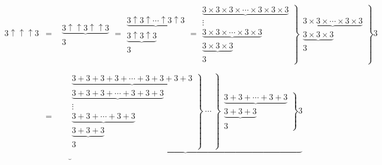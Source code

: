 \documentclass[a4j,fleqn,10pt]{jarticle}
\begin{document}
\scriptsize {
\begin{eqnarray}
3 \uparrow \uparrow \uparrow 3&=&
\left .
\begin{array} {c}
\underbrace {
3 \uparrow \uparrow 3 \uparrow \uparrow 3
}\\
3
\end{array}
\right . 
%
=
\left .
\begin{array} {c}
\underbrace {
3 \uparrow 3 \uparrow \cdots \uparrow 3 \uparrow 3
} \\
\underbrace {
3 \uparrow 3 \uparrow 3
} \\
3
\end{array}
\right .
=
\left . 
\left .
\begin{array} {c}
\underbrace {3 \times 3 \times 3 \times \dotsb \times 3 \times 3 \times 3 } \\
\vdots \\
\underbrace {3 \times 3 \times \dotsb \times 3 \times 3 } \\
\underbrace {3 \times 3 \times 3 } \\
3
\end{array}
\right \}
\begin{array} {c}
\underbrace {3 \times 3 \times \dotsb \times 3 \times 3 } \\
\underbrace {3 \times 3 \times 3 } \\
3
\end{array}
\right \} 3
\\
\nonumber \\
%
&=&
\left .
\begin{array} {rc}
&
\underbrace {
\left .
\left .
\begin{array} {c}
\underbrace {3+3+3+3+ \dotsb +3+3+3+3} \\
\underbrace {3+3+3+ \dotsb +3+3+3}\\
\vdots \\
\underbrace {3+3+ \dotsb +3+3}\\
\underbrace {3+3+3} \\
3
\end{array}
\right \}
\ \cdots \ 
\right \}
\left .
\begin{array} {c}
\underbrace {3+3+ \dotsb +3+3} \\
\underbrace {3+3+3}\\
3
\end{array}
\right \} 
3
} \\
&
\underbrace {
}
\end{array}
\end{eqnarray}}
\end{document}
